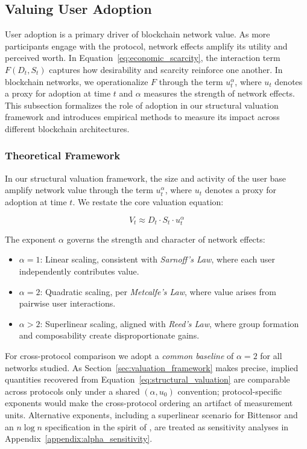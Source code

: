 \documentclass[12pt]{article}
\begin{document}
\subsection{Valuing User Adoption}

User adoption is a primary driver of blockchain network value. As more participants engage with the protocol, network effects amplify its utility and perceived worth. In Equation~\ref{eq:economic_scarcity}, the interaction term \(F(D_t,S_t)\) captures how desirability and scarcity reinforce one another. In blockchain networks, we operationalize \(F\) through the term \(u_t^\alpha\), where \(u_t\) denotes a proxy for adoption at time \(t\) and \(\alpha\) measures the strength of network effects. This subsection formalizes the role of adoption in our structural valuation framework and introduces empirical methods to measure its impact across different blockchain architectures.


\subsubsection{Theoretical Framework}

In our structural valuation framework, the size and activity of the user base amplify network value through the term \( u_t^\alpha \), where \( u_t \) denotes a proxy for adoption at time \( t \). We restate the core valuation equation:

\[
V_t \approx D_t \cdot S_t \cdot u_t^{\alpha}
\]

The exponent \( \alpha \) governs the strength and character of network effects:

\begin{itemize}
  \item \( \alpha = 1 \): Linear scaling, consistent with \textit{Sarnoff’s Law}, where each user independently contributes value.
  \item \( \alpha = 2 \): Quadratic scaling, per \textit{Metcalfe’s Law}, where value arises from pairwise user interactions.
  \item \( \alpha > 2 \): Superlinear scaling, aligned with \textit{Reed’s Law}, where group formation and composability create disproportionate gains.
\end{itemize}

For cross-protocol comparison we adopt a \emph{common baseline} of \( \alpha = 2 \) for all networks studied. As Section~\ref{sec:valuation_framework} makes precise, implied quantities recovered from Equation~\eqref{eq:structural_valuation} are comparable across protocols only under a shared \((\alpha, u_0)\) convention; protocol-specific exponents would make the cross-protocol ordering an artifact of measurement units. Alternative exponents, including a superlinear scenario for Bittensor and an \( n \log n \) specification in the spirit of \citet{briscoe2006metcalfe}, are treated as sensitivity analyses in Appendix~\ref{appendix:alpha_sensitivity}.
\end{document}
